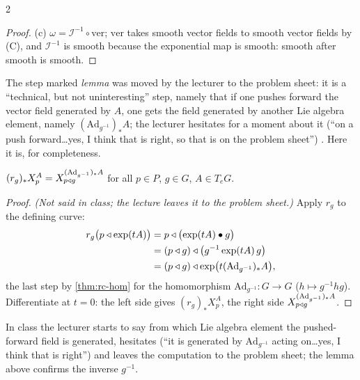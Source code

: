 \begin{paracol}{2}
\begin{proof}
(c) $\omega=\mathcal I^{-1}\circ\mathrm{ver}$; $\mathrm{ver}$ takes smooth vector fields to smooth vector fields by (C), and $\mathcal I^{-1}$ is smooth because the exponential map is smooth: smooth after smooth is smooth.   
\end{proof}
The step marked \emph{lemma} was moved by the lecturer to the problem sheet: it is a ``technical, but not uninteresting'' step, namely that if one pushes forward the vector field generated by $A$, one gets the field generated by another Lie algebra element, namely $(\mathrm{Ad}_{g^{-1}})_*A$; the lecturer hesitates for a moment about it (``on a push forward\ldots yes, I think that is right, so that is on the problem sheet'')     . Here it is, for completeness.
\begin{lemma}\label{lem:cn-ad}
$(r_g)_*X^A_p=X^{(\mathrm{Ad}_{g^{-1}})_*A}_{p\mathbin{\triangleleft} g}$ for all $p\in P$, $g\in G$, $A\in T_eG$. 
\end{lemma}
\begin{proof}
\emph{(Not said in class; the lecture leaves it to the problem sheet.)} Apply $r_g$ to the defining curve:
\[
  \begin{aligned}
  r_g\bigl(p\mathbin{\triangleleft}\exp(tA)\bigr)&=p\mathbin{\triangleleft}\bigl(\exp(tA)\bullet g\bigr)\\
  &=(p\mathbin{\triangleleft} g)\mathbin{\triangleleft}\bigl(g^{-1}\exp(tA)\,g\bigr)\\
  &=(p\mathbin{\triangleleft} g)\mathbin{\triangleleft}\exp\bigl(t(\mathrm{Ad}_{g^{-1}})_*A\bigr),
  \end{aligned}
\]
the last step by \cref{thm:rc-hom} for the homomorphism $\mathrm{Ad}_{g^{-1}}\colon G\to G$ ($h\mapsto g^{-1}hg$). Differentiate at $t=0$: the left side gives $(r_g)_*X^A_p$, the right side $X^{(\mathrm{Ad}_{g^{-1}})_*A}_{p\mathbin{\triangleleft} g}$.
\end{proof}
\begin{coursenote}
In class the lecturer starts to say from which Lie algebra element the pushed-forward field is generated, hesitates (``it is generated by $\mathrm{Ad}_{g^{-1}}$ acting on\ldots yes, I think that is right'') and leaves the computation to the problem sheet; the lemma above confirms the inverse $g^{-1}$. 
\end{coursenote}


\end{paracol}
